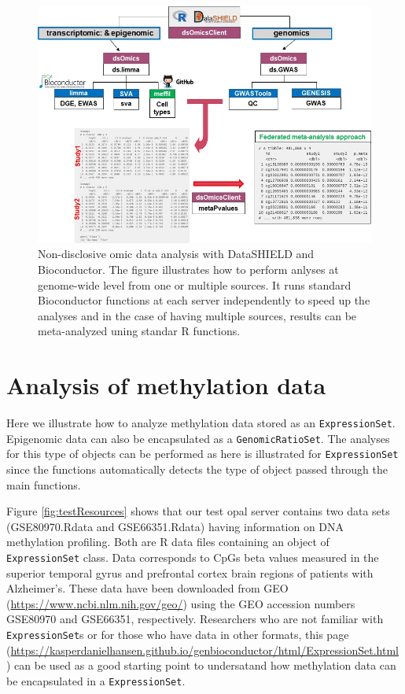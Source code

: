 \documentclass[]{article}
\begin{document}
\begin{figure}

{\centering \includegraphics[width=10\linewidth]{fig/dsOmics_C} 

}

\caption{Non-disclosive omic data analysis with DataSHIELD and Bioconductor. The figure illustrates how to perform anlyses at genome-wide level from one or multiple sources. It runs standard Bioconductor functions at each server independently to speed up the analyses and in the case of having multiple sources, results can be meta-analyzed uning standar R functions.}\label{fig:omicAnal2}
\end{figure}

\hypertarget{analysis-of-methylation-data}{%
\section{Analysis of methylation
data}\label{analysis-of-methylation-data}}

Here we illustrate how to analyze methylation data stored as an
\texttt{ExpressionSet}. Epigenomic data can also be encapsulated as a
\texttt{GenomicRatioSet}. The analyses for this type of objects can be
performed as here is illustrated for \texttt{ExpressionSet} since the
functions automatically detects the type of object passed through the
main functions.

Figure \ref{fig:testResources} shows that our test opal server contains
two data sets (GSE80970.Rdata and GSE66351.Rdata) having information on
DNA methylation profiling. Both are R data files containing an object of
\texttt{ExpressionSet} class. Data corresponds to CpGs beta values
measured in the superior temporal gyrus and prefrontal cortex brain
regions of patients with Alzheimer's. These data have been downloaded
from GEO (\url{https://www.ncbi.nlm.nih.gov/geo/}) using the GEO
accession numbers GSE80970 and GSE66351, respectively. Researchers who
are not familiar with \texttt{ExpressionSet}s or for those who have data
in other formats, this page
(\url{https://kasperdanielhansen.github.io/genbioconductor/html/ExpressionSet.html})
can be used as a good starting point to undersatand how methylation data
can be encapsulated in a \texttt{ExpressionSet}.
\end{document}
